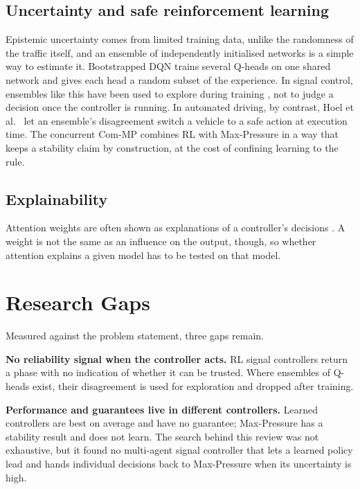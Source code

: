 \subsection{Uncertainty and safe reinforcement learning}
Epistemic uncertainty comes from limited training data, unlike the randomness of the traffic
itself, and an ensemble of independently initialised networks is a simple way to estimate it.
Bootstrapped DQN \citep{osband2016deep} trains several Q-heads on one shared network and
gives each head a random subset of the experience. In signal control, ensembles like this
have been used to explore during training \citep{tan2020multiagent}, not to judge a decision
once the controller is running. In automated driving, by contrast, Hoel et al.\
\citep{hoel2020tactical} let an ensemble's disagreement switch a vehicle to a safe action at
execution time. The concurrent Com-MP \citep{zhu2026commp} combines RL with Max-Pressure in a
way that keeps a stability claim by construction, at the cost of confining learning to the
rule.

\subsection{Explainability}
Attention weights are often shown as explanations of a controller's decisions
\citep{wei2019colight}. A weight is not the same as an influence on the output, though, so
whether attention explains a given model has to be tested on that model.

\section{Research Gaps}
\label{sec:gaps}

Measured against the problem statement, three gaps remain.

\textbf{No reliability signal when the controller acts.} RL signal controllers return a phase
with no indication of whether it can be trusted. Where ensembles of Q-heads exist, their
disagreement is used for exploration and dropped after training.

\textbf{Performance and guarantees live in different controllers.} Learned controllers are
best on average and have no guarantee; Max-Pressure has a stability result and does not
learn. The search behind this review was not exhaustive, but it found no multi-agent signal
controller that lets a learned policy lead and hands individual decisions back to
Max-Pressure when its uncertainty is high.


